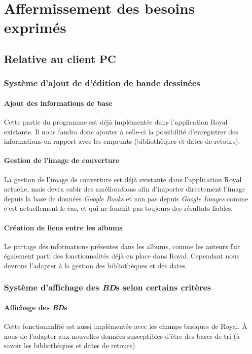\section{Affermissement des besoins exprimés} 

\subsection{Relative au client PC}
\subsubsection{Système d'ajout de d'édition de bande dessinées}

\paragraph{Ajout des informations de base}
Cette partie du programme est déjà implémentée dans l'application Royal existante. 
Il nous faudra donc ajouter à celle-ci la possibilité d'enregistrer des informations en rapport avec les emprunts (bibliothèques et dates de retours). 

\paragraph{Gestion de l'image de couverture}
La gestion de l'image de couverture est déjà existante dans l'application Royal actuelle,
	mais devra subir des améliorations afin d'importer directement l'image depuis la base de données \emph{Google Books} et non pas depuis \emph{Google Images} comme c'est actuellement le cas,
	et qui ne fournit pas toujours des résultats fiables.

\paragraph{Création de liens entre les albums}	
Le partage des informations présentes dans les albums, comme les auteurs fait également parti des fonctionnalités déjà en place dans Royal. 
Cependant nous devrons l'adapter à la gestion des bibliothèques et des dates. 

\subsubsection{Système d'affichage des \emph{BD}s selon certains critères}

\paragraph{Affichage des \emph{BD}s}
Cette fonctionnalité est aussi implémentée avec les champs basiques de Royal.
À nous de l'adapter aux nouvelles données susceptibles d'être des bases de tri 
(à savoir les bibliothèques et dates de retours). 

